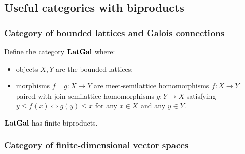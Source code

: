 \subsection{Useful categories with biproducts}
\label{sec:categories-with-biproducts}

\subsubsection{Category of bounded lattices and Galois connections}
\label{sec:categories-with-biproducts:latgal}

Define the category $\mathbf{LatGal}$ where:
\begin{itemize}
\item objects $X, Y$ are the bounded lattices;
\item morphisms $f \vdash g: X \to Y$ are meet-semilattice homomorphisms $f: X \to Y$ paired with
join-semilattice homomorphisms $g: Y \to X$ satisfying $y \leq f(x) \iff g(y) \leq x$ for any $x \in X$ and any
$y \in Y$.
\end{itemize}

\noindent $\mathbf{LatGal}$ has finite biproducts.

\subsubsection{Category of finite-dimensional vector spaces}
\label{sec:categories-with-biproducts:fdvect}

%
